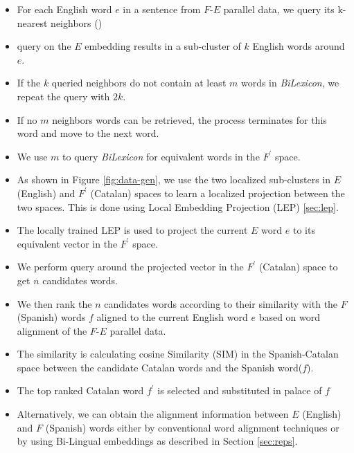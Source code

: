 \documentclass[a4paper]{article}
\begin{document}
\begin{itemize}
	\item For each English word $e$ in a sentence from $F$-$E$ parallel data, we query its k-nearest neighbors (\knn)
	\item \knn query on the $E$ embedding results  in a sub-cluster of $k$ English words around $e$. 
	\item If the $k$ queried neighbors do not contain at least $m$ words in {\it BiLexicon}, we repeat the query with $2k$.
	\item If no $m$ neighbors words can be retrieved,   the process  terminates for this word and move to the next word.
	\item We use $m$ to query {\it BiLexicon} for equivalent words in the  $F^\prime$ space.
	\item As shown in Figure \ref{fig:data-gen}, we use the two localized sub-clusters in $E$ (English) and $F^\prime$ (Catalan) spaces to learn a localized projection between the two spaces. This is done using Local Embedding Projection (LEP) \textsection\ref{sec:lep}.
	\item The locally trained LEP is used to project the current $E$ word $e$ to its equivalent vector in the $F^\prime$ space.
	\item We perform \knn query around the projected vector in the $F^\prime$ (Catalan) space  to get $n$ candidates words.
	\item We then rank the $n$ candidates words according to their similarity with the $F$ (Spanish) words $f$ aligned to the current English word $e$ based on word alignment of the $F$-$E$ parallel data.
	\item The similarity  is calculating cosine Similarity (SIM) in the Spanish-Catalan space between the candidate Catalan words and the Spanish word($f$). 
	\item The top ranked Catalan word $f^\prime$ is selected and substituted in palace of $f$
	\item Alternatively, we can obtain the alignment information between $E$ (English) and $F$ (Spanish) words either by conventional word alignment techniques or by using Bi-Lingual embeddings as described  in Section \textsection\ref{sec:reps}.
	
\end{itemize}
 

%
\end{document}
